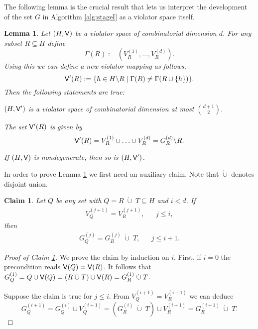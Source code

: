\documentclass[12pt]{article}
\def\Violators{{\sf V}}
\newtheorem{lemma2}[theorem2]{Lemma}
\newenvironment{lemma}{\begin{lemma2}}{\end{lemma2}}
\newtheorem{claim2}[theorem2]{Claim}
\newenvironment{claim}{\begin{claim2}}{\end{claim2}}
\theoremstyle{remark}
\let\newEnumerate=\enumerate
\renewenvironment{enumerate}{\newEnumerate\itemsep=0.0cm}{\endlist}
\begin{document}
    
    The following lemma is the crucial result that lets us interpret the development of the set $G$ in
    Algorithm \ref{alg:stageI} as a violator space itself.
    \begin{lemma}
    \label{lemma:54}
    Let $(H, \Violators)$ be a violator space of combinatorial dimension $d$. For any subset $R
\subseteq H$ define
    \[
    	\Gamma(R):= (V_{R}^{(1)}, \ldots, V_{R}^{(d)}).
    \]
    Using this we can define a new violator mapping as follows,
    \[
    	\Violators'(R):= \{ h\in H\backslash R \;|\; \Gamma(R)\neq \Gamma(R\cup \{h\} )\}.
    \]
    Then the following statements are true:
    \begin{enumerate}
    \item[\emph{(i)}] $(H, \Violators')$ is a violator space of combinatorial dimension at most ${d
+1}\choose {2}$.
    \item[\emph{(ii)}] The set $\Violators'(R)$ is given by
    \[
    	\Violators'(R) = V_{R}^{(1)} \cup \ldots \cup V_{R}^{(d)} = G_{R}^{(d)} \backslash R.
    \]
    \item[\emph{(iii)}] If $(H,\Violators)$ is nondegenerate, then so is $(H, \Violators')$.
    \end{enumerate}
    \end{lemma}
    
    In order to prove Lemma \ref{lemma:54} we first need an auxiliary claim. Note that $\dot{\cup}$
    denotes disjoint union.
    \begin{claim}
    \label{claim:1}
   Let $Q$ be any set with $Q = R\; \dot{\cup}\; T \subseteq H$ and $i < d$. If
   \begin{eqnarray*}
   	V_{Q}^{(j+1)} = V_{R}^{(j+1)} ,&& j\leq i,
   \end{eqnarray*}
   then
   \begin{eqnarray*}
   	G_{Q}^{(j)} = G_{R}^{(j)} \; \dot{\cup} \; T,& & j\leq i+1.
   \end{eqnarray*}
    \end{claim}
    \begin{proof}[Proof of Claim \ref{claim:1}]
    We prove the claim by induction on $i$. First, if $i=0$ the precondition reads $
    \Violators(Q) = \Violators(R)$. It follows that
    $G_{Q}^{(1)} = Q \cup \Violators(Q) = (R\;\dot{\cup}\; T) \cup \Violators(R) = G_{R}^{(1)}\;\dot{\cup}\; 
T$.
  
    
    Suppose the claim is true for $j\leq i$. From $V_{Q}^{(i+1)} = V_{R}^{(i+1)}$ we can deduce
    \[
    	G_{Q}^{(i+1)} = G_{Q}^{(i)} \cup V_{Q}^{(i+1)} = (G_{R}^{(i)} \;\dot{\cup}\; T) \cup V_{R}^{(i+1)} = 
G_{R}^{(i+1)} \;\dot{\cup}\; T.
    \]
    \end{proof}
    
\end{document}
